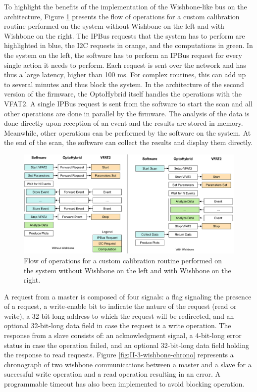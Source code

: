       To highlight the benefits of the implementation of the Wishbone-like bus on the architecture, Figure \ref{fig:II-3-wishbone-flow} presents the flow of operations for a custom calibration routine performed on the system without Wishbone on the left and with Wishbone on the right. The IPBus requests that the system has to perform are highlighted in blue, the I2C requests in orange, and the computations in green. In the system on the left, the software has to perform an IPBus request for every single action it needs to perform. Each request is sent over the network and has thus a large latency, higher than 100 ms. For complex routines, this can add up to several minutes and thus block the system. In the architecture of the second version of the firmware, the OptoHybrid itself handles the operations with the VFAT2. A single IPBus request is sent from the software to start the scan and all other operations are done in parallel by the firmware. The analysis of the data is done directly upon reception of an event and the results are stored in memory. Meanwhile, other operations can be performed by the software on the system. At the end of the scan, the software can collect the results and display them directly. \\

      \begin{figure}[h!]
        \centering
        \includegraphics[width=\textwidth]{img/II-3-test-beam/wishbone_flow}
        \caption{Flow of operations for a custom calibration routine performed on the system without Wishbone on the left and with Wishbone on the right.}
        \label{fig:II-3-wishbone-flow}
      \end{figure}

      A request from a master is composed of four signals: a flag signaling the presence of a request, a write-enable bit to indicate the nature of the request (read or write), a 32-bit-long address to which the request will be redirected, and an optional 32-bit-long data field in case the request is a write operation. The response from a slave consists of: an acknowledgment signal, a 4-bit-long error status in case the operation failed, and an optional 32-bit-long data field holding the response to read requests. Figure \ref{fig:II-3-wishbone-chrono} represents a chronograph of two wishbone communications between a master and a slave for a successful write operation and a read operation resulting in an error. A programmable timeout has also been implemented to avoid blocking operation.  \\

